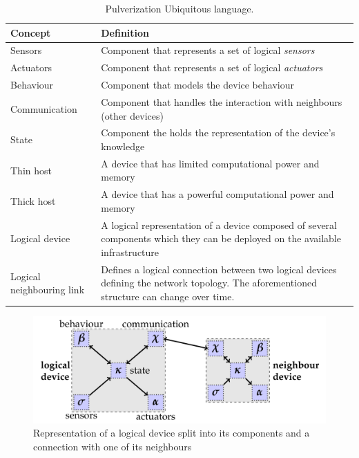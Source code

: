 \begin{table}
	\begin{tabularx}{\textwidth}{l X}
		\toprule
		\textbf{Concept}          & \textbf{Definition}                                                                                             \\
		\midrule
		Sensors                   & Component that represents a set of logical \emph{sensors}                                                       \\
		Actuators                 & Component that represents a set of logical \emph{actuators}                                                     \\
		Behaviour                 & Component that models the device behaviour                                                                      \\
		Communication             & Component that handles the interaction with neighbours (other devices)                                          \\
		State                     & Component the holds the representation of the device's knowledge                                                \\
		Thin host                 & A device that has limited computational power and memory                                                        \\
		Thick host                & A device that has a powerful computational power and memory                                                     \\
		Logical device            & A logical representation of a device composed of several components which they can be deployed on the available
		infrastructure                                                                                                                              \\
		Logical neighbouring link & Defines a logical connection between two logical devices defining the network topology.
		The aforementioned structure can change over time.                                                                                          \\
		\bottomrule
	\end{tabularx}
	\label{tab:ubiquitous-language}
	\caption{Pulverization Ubiquitous language.}
\end{table}

\begin{figure}
	\centering
	\includegraphics[width=\textwidth]{figures/original-components-interactions.png}
	\caption{Representation of a logical device split into its components and a connection with one of its neighbours}
	\label{fig:logical-device}
\end{figure}

